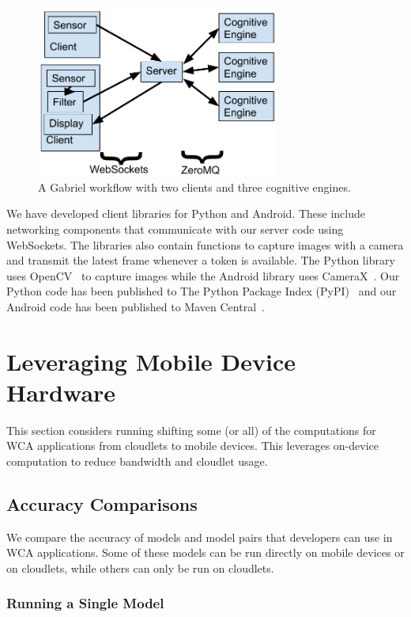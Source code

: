 \begin{figure}[h!]
  \includegraphics[width=8cm]{figures/runtime_architecture.pdf}
  \caption{A Gabriel workflow with two clients and three cognitive engines.
  }\label{fig:runtime_architecture}
\end{figure}

We have developed client libraries for Python and Android. These include
networking components that communicate with our server code using WebSockets.
The libraries also contain functions to capture images with a camera and
transmit the latest frame whenever a token is available. The Python library uses
OpenCV~\cite{opencv_library} to capture images while the Android library uses
CameraX~\cite{camerax}. Our Python code has been published to The Python Package
Index (PyPI)~\cite{gabriel_server, gabriel_python_client} and our Android code
has been published to Maven Central~\cite{gabriel_android_client}.

\section{Leveraging Mobile Device Hardware}

This section considers running shifting some (or all) of the computations for
WCA applications from cloudlets to mobile devices.
This leverages on-device computation to reduce bandwidth and cloudlet usage.

\subsection{Accuracy Comparisons}

We compare the accuracy of models and model pairs that developers can use in WCA
applications.
Some of these models can be run directly on mobile devices or on cloudlets,
while others can only be run on cloudlets.

\subsubsection{Running a Single Model}\label{sec:single_model}

